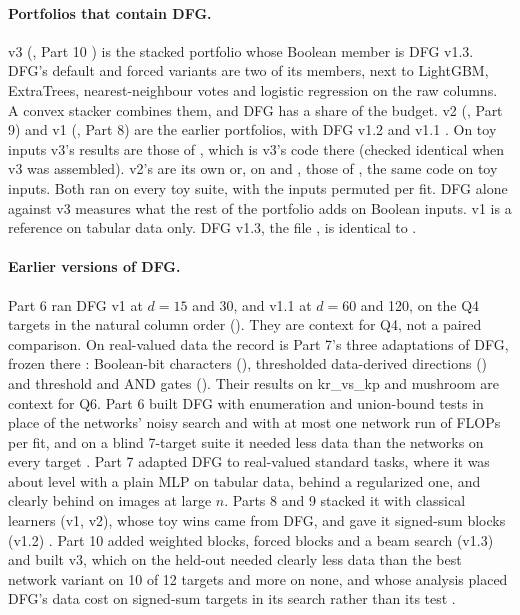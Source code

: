 \paragraph{Portfolios that contain DFG.} v3 (, Part 10 \cite{portfoliolearner2026}) is the stacked portfolio whose Boolean member is DFG v1.3. DFG's default and forced variants are two of its members, next to LightGBM, ExtraTrees, nearest-neighbour votes and logistic regression on the raw columns. A convex stacker combines them, and DFG has a share of the budget. v2 (, Part 9) and v1 (, Part 8) are the earlier portfolios, with DFG v1.2 and v1.1 \cite{discretelearners2026}.
On toy inputs v3's results are those of , which is v3's code there (checked identical when v3 was assembled). v2's are its own or, on  and , those of , the same code on toy inputs. Both ran on every toy suite, with the inputs permuted per fit. DFG alone against v3 measures what the rest of the portfolio adds on Boolean inputs. v1 is a reference on tabular data only. DFG v1.3, the file , is identical to .

\paragraph{Earlier versions of DFG.} Part 6 ran DFG v1 at $d=15$ and 30, and v1.1 at $d=60$ and 120, on the Q4 targets in the natural column order (). They are context for Q4, not a paired comparison. On real-valued data the record is Part 7's three adaptations of DFG, frozen there \cite{discretelearners2026}: Boolean-bit characters (), thresholded data-derived directions () and threshold and AND gates (). Their results on kr\_vs\_kp and mushroom are context for Q6. Part 6 built DFG with enumeration and union-bound tests in place of the networks' noisy search and with at most one network run of FLOPs per fit, and on a blind 7-target suite it needed less data than the networks on every target \cite{discretelearners2026}. Part 7 adapted DFG to real-valued standard tasks, where it was about level with a plain MLP on tabular data, behind a regularized one, and clearly behind on images at large $n$. Parts 8 and 9 stacked it with classical learners (v1, v2), whose toy wins came from DFG, and gave it signed-sum blocks (v1.2) \cite{discretelearners2026}. Part 10 added weighted blocks, forced blocks and a beam search (v1.3) and built v3, which on the held-out  needed clearly less data than the best network variant on 10 of 12 targets and more on none, and whose analysis placed DFG's data cost on signed-sum targets in its search rather than its test \cite{portfoliolearner2026}.

